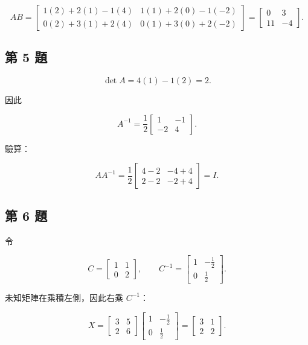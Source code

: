 \documentclass[11pt,a4paper]{article}
\begin{document}
\[
AB=
\begin{bmatrix}
1(2)+2(1)-1(4)&1(1)+2(0)-1(-2)\\
0(2)+3(1)+2(4)&0(1)+3(0)+2(-2)
\end{bmatrix}
=
\boxed{\begin{bmatrix}0&3\\11&-4\end{bmatrix}}.
\]

\subsection{第 5 題}\label{ux7b2c-5-ux984c}

\[
\det A=4(1)-1(2)=2.
\]

因此

\[
\boxed{
A^{-1}
=\frac12\begin{bmatrix}1&-1\\-2&4\end{bmatrix}}.
\]

驗算：

\[
AA^{-1}
=\frac12
\begin{bmatrix}
4-2&-4+4\\
2-2&-2+4
\end{bmatrix}
=I.
\]

\subsection{第 6 題}\label{ux7b2c-6-ux984c}

令

\[
C=\begin{bmatrix}1&1\\0&2\end{bmatrix},
\qquad
C^{-1}=\begin{bmatrix}1&-\tfrac12\\0&\tfrac12\end{bmatrix}.
\]

未知矩陣在乘積左側，因此右乘 \(C^{-1}\)：

\[
X=
\begin{bmatrix}3&5\\2&6\end{bmatrix}
\begin{bmatrix}1&-\tfrac12\\0&\tfrac12\end{bmatrix}
=
\boxed{\begin{bmatrix}3&1\\2&2\end{bmatrix}}.
\]
\end{document}
